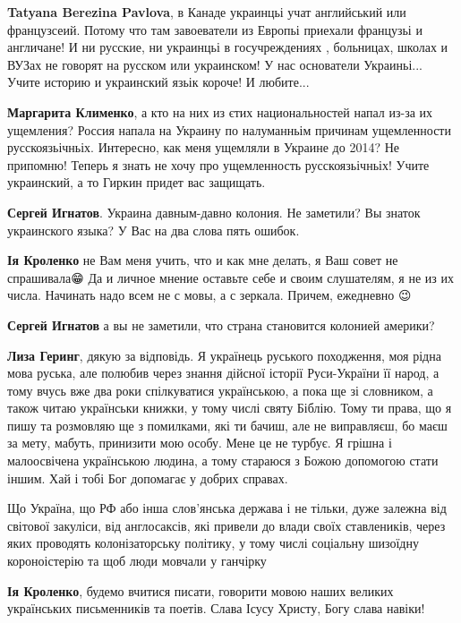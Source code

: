 \begin{itemize}
\begin{itemize}
\textbf{Tatyana Berezina Pavlova}, в Канаде украинцьі учат английський или
французсеий. Потому что там завоеватели из Европьі приехали французьі и
англичане! И ни русские, ни украинцьі в госучреждениях , больницах, школах и
ВУЗах не говорят на русском или украинском! У нас основатели Украиньі... Учите
историю и украинский язьік короче! И любите...

\textbf{Маргарита Клименко}, а кто на них из єтих национальностей напал из-за
их ущемления? Россия напала на Украину по налуманньім причинам ущемленности
русскоязьічньіх. Интересно, как меня ущемляли в Украине до 2014? Не припомню!
Теперь я знать не хочу про ущемленность русскоязьічньіх! Учите украинский, а то
Гиркин придет вас защищать.

\textbf{Сергей Игнатов}. Украина давным-давно колония. Не заметили? Вы знаток украинского языка? У Вас на два слова пять ошибок.

\textbf{Ія Кроленко} не Вам меня учить, что и как мне делать, я Ваш совет не
спрашивала😁 Да и личное мнение оставьте себе и своим слушателям, я не из их
числа. Начинать надо всем не с мовы, а с зеркала. Причем, ежедневно 😉

\textbf{Сергей Игнатов} а вы не заметили, что страна становится колонией америки?

\textbf{Лиза Геринг}, дякую за відповідь. Я українець руського походження, моя
рідна мова руська, але полюбив через знання дійсної історії Руси-України її
народ, а тому вчусь вже два роки спілкуватися українською, а пока ще зі
словником, а також читаю українськи книжки, у тому числі святу Біблію. Тому ти
права, що я пишу та розмовляю ще з помилками, які ти бачиш, але не виправляєш,
бо маєш за мету, мабуть, принизити мою особу. Мене це не турбує. Я грішна і
малоосвічена українською людина, а тому стараюся з Божою допомогою стати іншим.
Хай і тобі Бог допомагає у добрих справах.

Що Україна, що РФ або інша слов'янська держава і не тільки, дуже залежна від
світової закуліси, від англосаксів, які привели до влади своїх ставлеників,
через яких проводять колонізаторську політику, у тому числі соціальну шизоїдну
короноістерію та щоб люди мовчали у ганчірку

\textbf{Ія Кроленко}, будемо вчитися писати, говорити мовою наших великих
українських письменників та поетів. Слава Ісусу Христу, Богу слава навіки!


\end{itemize}
\end{itemize}
